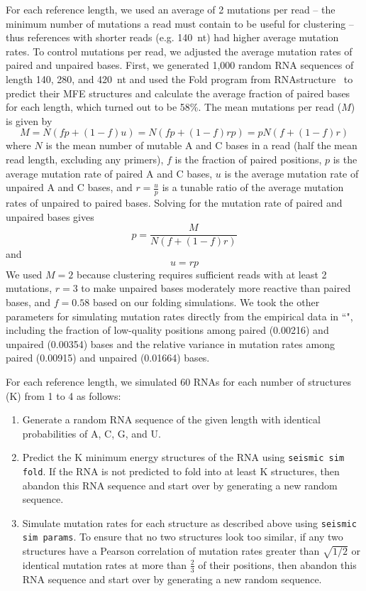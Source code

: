 \documentclass[unnumsec,webpdf,contemporary,large]{oup-authoring-template}%
\theoremstyle{thmstyleone}%
\theoremstyle{thmstyletwo}%
\theoremstyle{thmstylethree}%
\begin{document}
For each reference length, we used an average of 2 mutations per read -- the minimum number of mutations a read must contain to be useful for clustering -- thus references with shorter reads (e.g. 140~nt) had higher average mutation rates.
To control mutations per read, we adjusted the average mutation rates of paired and unpaired bases.
First, we generated 1,000 random RNA sequences of length 140, 280, and 420~nt and used the Fold program from RNAstructure~\cite{Reuter2010} to predict their MFE structures and calculate the average fraction of paired bases for each length, which turned out to be 58\%.
The mean mutations per read ($M$) is given by
\begin{equation}
    M = N(fp + (1-f)u) = N(fp + (1-f)rp) = pN(f + (1-f)r)
\end{equation}
where $N$ is the mean number of mutable A and C bases in a read (half the mean read length, excluding any primers), $f$ is the fraction of paired positions, $p$ is the average mutation rate of paired A and C bases, $u$ is the average mutation rate of unpaired A and C bases, and $r = \frac{u}{p}$ is a tunable ratio of the average mutation rates of unpaired to paired bases.
Solving for the mutation rate of paired and unpaired bases gives
\begin{equation}
    p = \frac{M}{N(f + (1-f)r)}
\end{equation}
and
\begin{equation}
    u = rp
\end{equation}
We used $M = 2$ because clustering requires sufficient reads with at least 2 mutations, $r = 3$ to make unpaired bases moderately more reactive than paired bases, and $f = 0.58$ based on our folding simulations.
We took the other parameters for simulating mutation rates directly from the empirical data in ``", including the fraction of low-quality positions among paired (0.00216) and unpaired (0.00354) bases and the relative variance in mutation rates among paired (0.00915) and unpaired (0.01664) bases.

For each reference length, we simulated 60 RNAs for each number of structures (K) from 1 to 4 as follows:
\begin{enumerate}
    \item Generate a random RNA sequence of the given length with identical probabilities of A, C, G, and U.
    \item Predict the K minimum energy structures of the RNA using \verb|seismic sim fold|. If the RNA is not predicted to fold into at least K structures, then abandon this RNA sequence and start over by generating a new random sequence.
    \item Simulate mutation rates for each structure as described above using \verb|seismic sim params|. To ensure that no two structures look too similar, if any two structures have a Pearson correlation of mutation rates greater than $\sqrt{1/2}$ or identical mutation rates at more than $\frac{2}{3}$ of their positions, then abandon this RNA sequence and start over by generating a new random sequence.
\end{enumerate}
\end{document}
